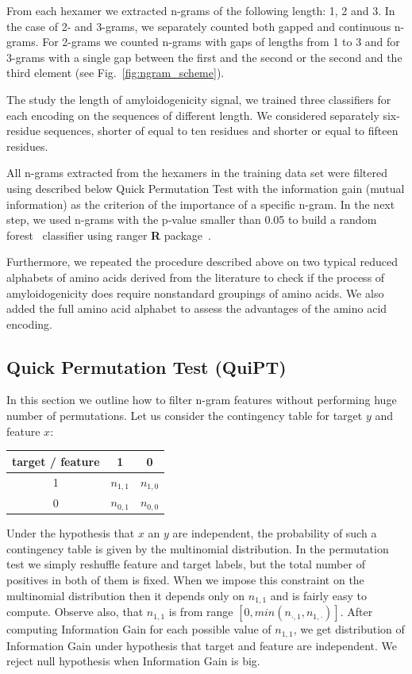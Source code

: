 \documentclass{bioinfo}
\begin{document}
\begin{methods}
  From each hexamer we extracted n-grams of the following length: 1, 2 and 3. In 
the case of 2- and 3-grams, we separately counted both gapped and continuous 
n-grams. For 2-grams we counted n-grams with gaps of lengths from 1 to 3 and for 
3-grams with a single gap between the first and the second or the second and the 
third element (see Fig.~\ref{fig:ngram_scheme}).

  The study the length of amyloidogenicity signal, we trained three 
classifiers for each encoding on the sequences of different length. We 
considered separately six-residue sequences, shorter of equal to ten residues 
and shorter or equal to fifteen residues.

  All n-grams extracted from the hexamers in the training data set were filtered 
using described below Quick Permutation Test with the information gain (mutual 
information) as the criterion of the importance of a specific n-gram. In the 
next step, we used n-grams with the p-value smaller than 0.05 to build a random 
forest~\citep{breiman_random_2001} classifier using ranger \textbf{R} 
package~\citep{wright_ranger:_2015}. 

  Furthermore, we repeated the procedure described above on two typical reduced 
alphabets of amino acids derived from the literature to check if the process of 
amyloidogenicity does require nonstandard groupings of amino acids. We also 
added the full amino acid alphabet to assess the advantages of the amino acid 
encoding.

\subsection{Quick Permutation Test (QuiPT)}

In this section we outline how to filter n-gram features without performing huge number of permutations. 
Let us consider the contingency table for target $y$ and feature $x$:

\begin{center}
\begin{tabular}{ | c || c | c | }
  \hline			
  target / feature & 1 & 0 \\ \hline
 1 & $n_{1,1}$ & $n_{1,0}$ \\
 0 & $n_{0,1}$ & $n_{0,0}$ \\
  \hline  
\end{tabular} 
\end{center}

Under the hypothesis that $x$ an $y$ are independent, the probability of such a contingency  table 
is given by the multinomial distribution. In the permutation test we simply reshuffle 
feature and target labels, but the total number of positives in both of them
is fixed. When we impose this constraint on the multinomial distribution then
it depends only on $n_{1,1}$ and is fairly easy to compute.
Observe also, that $n_{1,1}$ is from range $[0,min(n_{\cdot, 1}, n_{1, \cdot})]$.
After computing Information Gain for each possible value of $n_{1,1}$, we get
distribution of Information Gain under hypothesis that target and feature
are independent. We reject null hypothesis when Information Gain is big.


\end{methods}
\end{document}
